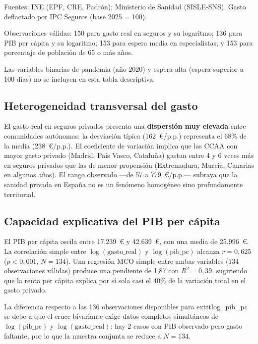\begin{table}[htbp]
\begin{threeparttable}
\begin{tablenotes}[flushleft]
      \item Fuentes: INE (EPF, CRE, Padrón); Ministerio de Sanidad (SISLE-SNS).
        Gasto deflactado por IPC Seguros
        (base 2025 = 100).
      \item Observaciones válidas: 150 para gasto real en seguros y su logaritmo;
        136 para PIB per cápita y su logaritmo; 153 para espera media en
        especialistas; y 153 para porcentaje de población de 65 o más años.
      \item Las variables binarias de pandemia (año 2020) y espera alta
        (espera superior a 100 días) no se incluyen en esta tabla descriptiva.
    \end{tablenotes}
  \end{threeparttable}
\end{table}

\subsection{Heterogeneidad transversal del gasto}

El gasto real en seguros privados presenta una \textbf{dispersión muy elevada}
entre comunidades autónomas: la desviación típica (162~€/p.p.) representa el 68\%
de la media (238~€/p.p.). El coeficiente de variación implica que las CCAA con
mayor gasto privado (Madrid, País Vasco, Cataluña) gastan entre 4 y 6 veces más
en seguros privados que las de menor propensión (Extremadura, Murcia, Canarias en
algunos años). El rango observado ---de 57 a 779~€/p.p.--- subraya que la sanidad
privada en España no es un fenómeno homogéneo sino profundamente territorial.

\subsection{Capacidad explicativa del PIB per cápita}

El PIB per cápita oscila entre 17.239~€ y 42.639~€, con una media de 25.996~€.
La correlación simple entre $\log(\text{gasto\_real})$ y $\log(\text{pib\_pc})$
alcanza $r = 0{,}625$ ($p < 0{,}001$, $N = 134$). Una regresión MCO simple entre
ambas variables (134 observaciones válidas) produce una pendiente de 1{,}87 con
$R^2 = 0{,}39$, sugiriendo que la renta per cápita explica por sí sola casi el
40\% de la variación total en el gasto privado.

La diferencia respecto a las 136 observaciones disponibles para
	exttt{log\_pib\_pc} se debe a que el cruce bivariante exige datos completos
simultáneos de $\log(\text{pib\_pc})$ y $\log(\text{gasto\_real})$: hay 2 casos
con PIB observado pero gasto faltante, por lo que la muestra conjunta se reduce a
$N = 134$.

